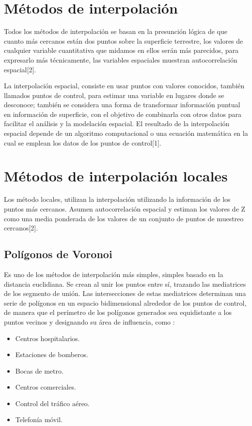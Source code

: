 \section{Métodos de interpolación}
\label{sec:cap2-metodos-interpolacion}
Todos los métodos de interpolación se basan en la presunción lógica de que
cuanto más cercanos están dos puntos sobre la superficie terrestre, los
valores de cualquier variable cuantitativa que midamos en ellos serán más
parecidos, para expresarlo más técnicamente, las variables espaciales
muestran autocorrelación espacial[2].

La interpolación espacial, consiste en usar puntos con valores conocidos,
también llamados puntos de control, para estimar una variable en lugares
donde se desconoce; también se considera una forma de transformar información
puntual en información de superficie, con el objetivo de combinarla con
otros datos para facilitar el análisis y la modelación espacial.
El resultado de la interpolación espacial depende de un algoritmo
computacional o una ecuación matemática en la cual se emplean los datos
de los puntos de control[1].

\section{Métodos de interpolación locales}
Los método locales, utilizan la interpolación utilizando la información
de los puntos más cercanos. Asumen autocorrelación espacial y estiman los
valores de Z como una media ponderada de los valores de un conjunto de
puntos de muestreo cercanos[2].

\subsection{Polígonos de Voronoi}
Es uno de los métodos de interpolación más simples, simples basado en la
distancia euclidiana. Se crean al unir los puntos entre sí, trazando las
mediatrices de los segmento de unión. Las intersecciones de estas mediatrices
determinan una serie de polígonos en un espacio bidimensional alrededor de
los puntos de control, de manera que el perímetro de los polígonos generados
sea equidistante a los puntos vecinos y designando su área de influencia, como :
\begin{itemize}
    \item Centros hospitalarios.
    \item Estaciones de bomberos.
    \item Bocas de metro.
    \item Centros comerciales.
    \item Control del tráfico aéreo.
    \item Telefonía móvil.
\end{itemize}

